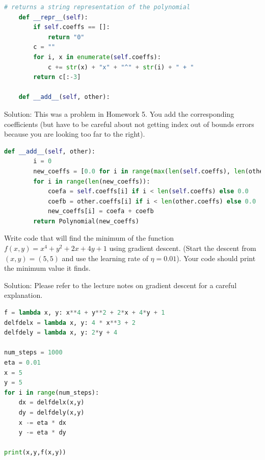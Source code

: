 \documentclass[addpoints,12pt]{exam}
\begin{document}
\begin{questions}
\begin{lstlisting}[language=python]
    # returns a string representation of the polynomial
    def __repr__(self):
        if self.coeffs == []:
            return "0"
        c = ""
        for i, x in enumerate(self.coeffs):
            c += str(x) + "x" + "^" + str(i) + " + "
        return c[:-3]
    
    def __add__(self, other):
\end{lstlisting}


\vspace{0.8in}
Solution: This was a problem in Homework 5. You add the corresponding coefficients (but have to be careful about not getting index out of bounds errors because you are looking too far to the right).

\begin{lstlisting}[language=python]
    def __add__(self, other):
        i = 0
        new_coeffs = [0.0 for i in range(max(len(self.coeffs), len(other.coeffs)))]
        for i in range(len(new_coeffs)):
            coefa = self.coeffs[i] if i < len(self.coeffs) else 0.0
            coefb = other.coeffs[i] if i < len(other.coeffs) else 0.0
            new_coeffs[i] = coefa + coefb
        return Polynomial(new_coeffs)

\end{lstlisting}

\newpage
\question[20] Write code that will find the minimum of the function $f(x,y) = x^4 + y^2 + 2x + 4y + 1$ using gradient descent. (Start the descent from $(x,y) = (5,5)$ and use the learning rate of $\eta = 0.01$). Your code should print the minimum value it finds. 


\vspace{0.8in}
Solution: Please refer to the lecture notes on gradient descent for a careful explanation. 

\vspace{0.2in}
\begin{lstlisting}[language=python]
f = lambda x, y: x**4 + y**2 + 2*x + 4*y + 1
delfdelx = lambda x, y: 4 * x**3 + 2
delfdely = lambda x, y: 2*y + 4

num_steps = 1000
eta = 0.01
x = 5
y = 5
for i in range(num_steps):
    dx = delfdelx(x,y)
    dy = delfdely(x,y)
    x -= eta * dx
    y -= eta * dy

print(x,y,f(x,y))
\end{lstlisting}

\end{questions}
\end{document}

